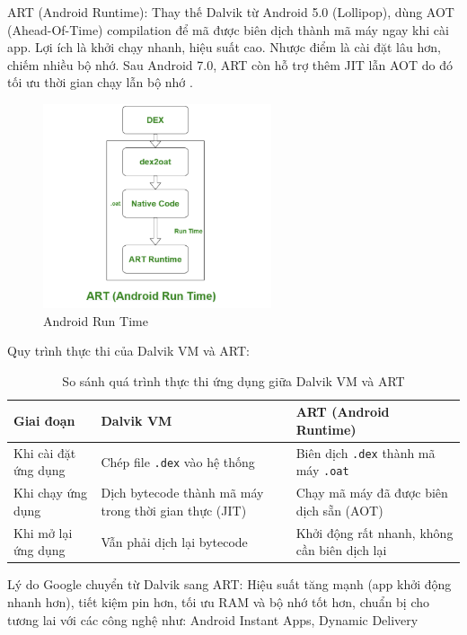     ART (Android Runtime): Thay thế Dalvik từ Android 5.0 (Lollipop), dùng AOT (Ahead-Of-Time) compilation để mã được biên dịch thành mã máy ngay khi cài app.
    Lợi ích là khởi chạy nhanh, hiệu suất cao.
    Nhược điểm là cài đặt lâu hơn, chiếm nhiều bộ nhớ.
    Sau Android 7.0, ART còn hỗ trợ thêm JIT lẫn AOT do đó tối ưu thời gian chạy lẫn bộ nhớ \cite{art-dalvik}.   
    \begin{figure}[H] 
        \centering
        \includegraphics[width=0.6\textwidth]{images/ART.png}
        \caption{Android Run Time}
        \label{fig:android}
    \end{figure}  
\newpage
    Quy trình thực thi của Dalvik VM và ART:
    \begin{table}[H]
        \centering
        \renewcommand{\arraystretch}{1.5}
        \begin{tabular}{|p{4cm}|p{5cm}|p{5cm}|}
        \hline
        \textbf{Giai đoạn} & \textbf{Dalvik VM} & \textbf{ART (Android Runtime)} \\
        \hline
        Khi cài đặt ứng dụng & Chép file \texttt{.dex} vào hệ thống & Biên dịch \texttt{.dex} thành mã máy \texttt{.oat} \\
        \hline
        Khi chạy ứng dụng & Dịch bytecode thành mã máy trong thời gian thực (JIT) & Chạy mã máy đã được biên dịch sẵn (AOT) \\
        \hline
        Khi mở lại ứng dụng & Vẫn phải dịch lại bytecode & Khởi động rất nhanh, không cần biên dịch lại \\
        \hline
        \end{tabular}
        \caption{So sánh quá trình thực thi ứng dụng giữa Dalvik VM và ART}
        \label{tab:dalvik-vs-art}
        \end{table}
          
    Lý do Google chuyển từ Dalvik sang ART: Hiệu suất tăng mạnh (app khởi động nhanh hơn), tiết kiệm pin hơn, tối ưu RAM và bộ nhớ tốt hơn, chuẩn bị cho tương lai với các công nghệ như: Android Instant Apps, Dynamic Delivery

